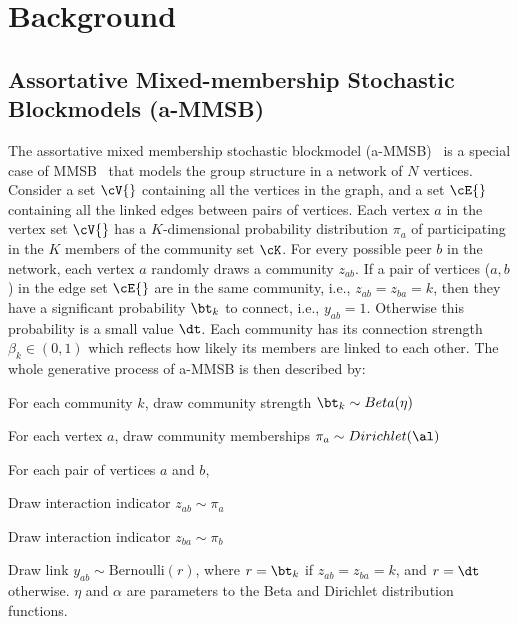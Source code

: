 
\newcommand{\Vertices}{\ensuremath{\cV{}}\xspace}
\newcommand{\Edges}{\ensuremath{\cE{}}\xspace}
\newcommand{\Heldout}{\ensuremath{\cE_h{}}\xspace}
\newcommand{\SGLDMinibatch}{\ensuremath{\cD_n{}}\xspace}
\newcommand{\Minibatch}{\ensuremath{\cE_n{}}\xspace}
\newcommand{\Minibatcht}{\ensuremath{\cE_n{}}\xspace}
\newcommand{\Neighbors}{\ensuremath{\cV_n{}}\xspace}

\section{Background}
\label{sec-background}

\subsection{Assortative Mixed-membership Stochastic Blockmodels (a-MMSB)}
The assortative mixed membership stochastic blockmodel (a-MMSB)~\cite{gopalan2012scalable} is a special case of MMSB~\cite{airoldi2009mixed} that models the group structure in a network of $N$ vertices. Consider a set  \Vertices containing all the vertices in the graph, and a set \Edges containing all the linked edges between pairs of vertices. Each vertex $a$ in the vertex set \Vertices has a $K$-dimensional probability distribution $\pi_a$ of participating in the $K$ members of the community set $\cK$.  For every possible peer $b$ in the network, each vertex $a$ randomly draws a community $z_{ab}$. If a pair of vertices ($a,b$) in the edge set \Edges are in the same community, i.e., $z_{ab}=z_{ba} = k$, then they have a significant probability $\bt_k$ to connect, i.e., $y_{ab}=1$. Otherwise this probability is a small value $\dt$. Each community has its connection strength $\beta_{k} \in (0,1)$ which reflects how likely its members are linked to each other. The whole generative process of a-MMSB is then described by:
\benum
\item For each community $k$, draw community strength $\bt_k \sim \mbox{Beta}(\eta)$
\item For each vertex $a$, draw community memberships $\pi_a \sim \mbox{Dirichlet}(\al)$
\item For each pair of vertices $a$ and $b$,
\benum
	\item Draw interaction indicator $z_{ab} \sim \pi_a$
    \item Draw interaction indicator $z_{ba} \sim \pi_b$
    \item Draw link $y_{ab} \sim \mbox{Bernoulli}(r)$, where $r = \bt_k$ if $z_{ab}=z_{ba}=k$, and $r=\dt$ otherwise.
\eenum
\eenum
$\eta$ and $\alpha$ are parameters to the Beta and Dirichlet distribution functions.

